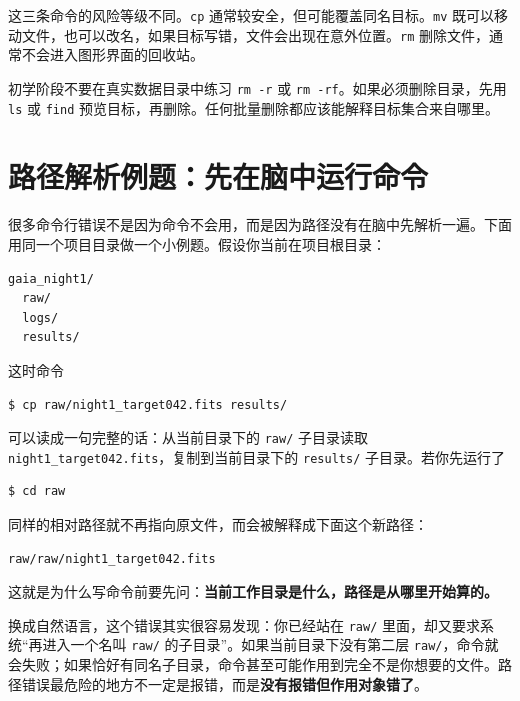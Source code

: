 这三条命令的风险等级不同。\texttt{cp} 通常较安全，但可能覆盖同名目标。\texttt{mv} 既可以移动文件，也可以改名，如果目标写错，文件会出现在意外位置。\texttt{rm} 删除文件，通常不会进入图形界面的回收站。

\begin{warnbox}
初学阶段不要在真实数据目录中练习 \texttt{rm -r} 或 \texttt{rm -rf}。如果必须删除目录，先用 \texttt{ls} 或 \texttt{find} 预览目标，再删除。任何批量删除都应该能解释目标集合来自哪里。
\end{warnbox}

\section{路径解析例题：先在脑中运行命令}

很多命令行错误不是因为命令不会用，而是因为路径没有在脑中先解析一遍。下面用同一个项目目录做一个小例题。假设你当前在项目根目录：

\begin{lstlisting}[style=terminal]
gaia_night1/
  raw/
  logs/
  results/
\end{lstlisting}

这时命令

\begin{lstlisting}[style=terminal]
$ cp raw/night1_target042.fits results/
\end{lstlisting}

可以读成一句完整的话：从当前目录下的 \texttt{raw/} 子目录读取 \texttt{night1\_target042.fits}，复制到当前目录下的 \texttt{results/} 子目录。若你先运行了

\begin{lstlisting}[style=terminal]
$ cd raw
\end{lstlisting}

同样的相对路径就不再指向原文件，而会被解释成下面这个新路径：

\begin{lstlisting}[style=terminal]
raw/raw/night1_target042.fits
\end{lstlisting}

这就是为什么写命令前要先问：\textbf{当前工作目录是什么，路径是从哪里开始算的。}

换成自然语言，这个错误其实很容易发现：你已经站在 \texttt{raw/} 里面，却又要求系统“再进入一个名叫 \texttt{raw/} 的子目录”。如果当前目录下没有第二层 \texttt{raw/}，命令就会失败；如果恰好有同名子目录，命令甚至可能作用到完全不是你想要的文件。路径错误最危险的地方不一定是报错，而是\textbf{没有报错但作用对象错了}。

